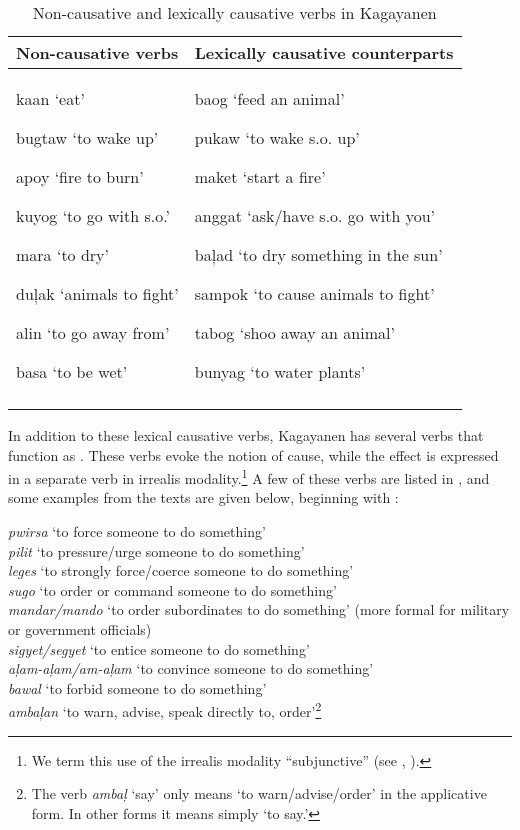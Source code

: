 \begin{table}
\caption{Non-causative and lexically causative verbs in Kagayanen}
\label{tab:non-causativeandlexicallycausativeverbs}
\begin{tabularx}{\textwidth}{XX}
\lsptoprule
Non-causative verbs &  Lexically causative counterparts \\
\midrule
kaan ‘eat’

bugtaw ‘to wake up’

apoy ‘fire to burn’

kuyog ‘to go with s.o.’

mara ‘to dry’

duļak ‘animals to fight’

alin ‘to go away from’

basa ‘to be wet’ & baog ‘feed an animal’

pukaw ‘to wake s.o. up’

maket ‘start a fire’

anggat ‘ask/have s.o. go with you’

baļad ‘to dry something in the sun’

sampok ‘to cause animals to fight’

tabog ‘shoo away an animal’

bunyag ‘to water plants’ \\
\lspbottomrule
\end{tabularx}
\end{table}
In addition to these lexical causative verbs, Kagayanen has several verbs that function as . These verbs evoke the notion of cause, while the effect is expressed in a separate verb in irrealis modality.\footnote{We term this use of the irrealis modality “subjunctive” (see , ).} A few of these verbs are listed in , and some examples from the texts are given below, beginning with :


 \ea
\label{bkm:Ref501085954}
\textit{pwirsa}     ‘to force someone to do something’ \\
\textit{pilit}     ‘to pressure/urge someone to do something’ \\
\textit{leges}     ‘to strongly force/coerce someone to do something’ \\
\textit{sugo}     ‘to order or command someone to do something’ \\
\textit{mandar/mando}  ‘to order subordinates to do something’ (more formal for military or government officials) \\
\textit{sigyet/segyet}  ‘to entice someone to do something’ \\
\textit{aļam-aļam/am-aļam} ‘to convince someone to do something’ \\
\textit{bawal}     ‘to forbid someone to do something’ \\
\textit{ambaļan}     ‘to warn, advise, speak directly to, order’\footnote{The verb \textit{ambaļ} ‘say’ only means ‘to warn/advise/order’ in the applicative form. In other forms it means simply ‘to say.’}
\z


